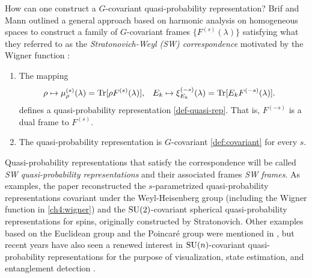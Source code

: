 How can one construct a $G$-covariant quasi-probability representation? Brif and Mann \cite{brif_phase-space_1999} outlined a general approach based on harmonic analysis on homogeneous spaces to construct a family of $G$-covariant frames $\{F^{(s)}(\lambda) \}$ satisfying what they referred to as the \emph{Stratonovich-Weyl (SW) correspondence} motivated by the Wigner function \cite{stratonovich_distributions_1957}:
\begin{enumerate}
	\item The mapping
		\begin{align}
		\rho &\mapsto \mu_{\rho}^{(s)}(\lambda) = \mathrm{Tr}[\rho F^{(s)}(\lambda)], & E_k &\mapsto \xi_{E_k}^{(-s)}(\lambda) = \mathrm{Tr} [E_k F^{(-s)}(\lambda)].
		\end{align}
	defines a quasi-probability representation \eqref{def-quasi-rep}. That is, $F^{(-s)}$ is a dual frame to $F^{(s)}$.
	\item The quasi-probability representation is $G$-covariant \eqref{def:covariant} for every $s$.
\end{enumerate}
Quasi-probability representations that satisfy the correspondence will be called \emph{SW quasi-probability representations} and their associated frames \emph{SW frames}.
As examples, the paper \cite{brif_phase-space_1999} reconstructed the $s$-parametrized quasi-probability representations covariant under the Weyl-Heisenberg group (including the Wigner function in \autoref{ch4:wigner}) and the $\text{SU}(2)$-covariant spherical quasi-probability representations for spins, originally constructed by Stratonovich. Other examples based on the Euclidean group and the Poincar{\'e} group were mentioned in \cite{brif_phase-space_1999}, but recent years have also seen a renewed interest in $\text{SU}(n)$-covariant quasi-probability representations for the purpose of visualization, state estimation, and entanglement detection \cite{klimov_general_2010,tilma_sun-symmetric_2012,rios_symbol_2014,tilma_wigner_2016,rundle_simple_2017}.




